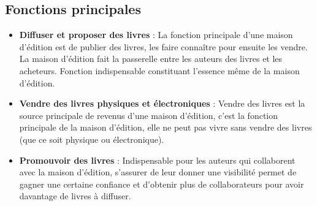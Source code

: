 \documentclass[14pt]{extarticle}
\begin{document}
\subsection{Fonctions principales}
\begin{itemize}
    \item \textbf{Diffuser et proposer des livres} : La fonction principale d'une maison d'édition est de publier des livres, les faire connaître pour ensuite les vendre. La maison d'édition fait la passerelle entre les auteurs des livres et les acheteurs. Fonction indispensable constituant l'essence même de la maison d'édition.
    
    \item \textbf{Vendre des livres physiques et électroniques} : Vendre des livres est la source principale de revenus d'une maison d'édition, c'est la fonction principale de la maison d'édition, elle ne peut pas vivre sans vendre des livres (que ce soit physique ou électronique).
    
    \item \textbf{Promouvoir des livres} : Indispensable pour les auteurs qui collaborent avec la maison d'édition, s'assurer de leur donner une visibilité permet de gagner une certaine confiance et d'obtenir plus de collaborateurs pour avoir davantage de livres à diffuser.
\end{itemize}
\end{document}
